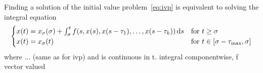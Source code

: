     \begin{lemma}\label{lm:integral-equation}
        Finding a solution of the initial value problem~\eqref{eq:ivp} is equivalent to solving the integral equation
        \begin{equation*}\label{eq:integral-equation}
            \begin{cases}
                x(t) = x_{\tzero}(\tzero) + \integral{\tzero}{t} f(s,x(s),x(s-\tau_1),\ldots,x(s-\tau_k))\dx[s] & \text{for } t\geq\tzero\\
                x(t) = x_{\tzero}(t) & \text{for } t\in [\tzero-\taumax,\tzero]
            \end{cases}
        \end{equation*}
        where ... (same as for ivp)
        and is continuous in t.
        integral componentwise, f vector valued
    \end{lemma}
